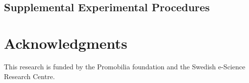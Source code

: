 





\begin{appendices}
	\renewcommand{\thesection}{\Roman{section}}
	
	
	
	\section{Supplemental Experimental Procedures}
	
	
	
	
	
	
	
\end{appendices}
%

\section*{Acknowledgments}
This research is funded by the Promobilia foundation and the Swedish
e-Science Research Centre.

{\small
}